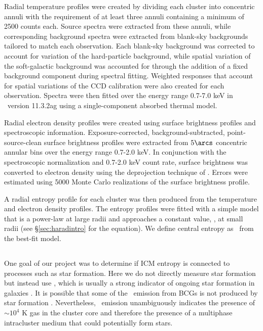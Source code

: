Radial temperature profiles were created by dividing each cluster into
concentric annuli with the requirement of at least three annuli
containing a minimum of 2500 counts each. Source spectra were
extracted from these annuli, while corresponding background spectra
were extracted from blank-sky backgrounds tailored to match each
observation. Each blank-sky background was corrected to account for
variation of the hard-particle background, while spatial variation of
the soft-galactic background was accounted for through the addition of
a fixed background component during spectral fitting. Weighted
responses that account for spatial variations of the CCD calibration
were also created for each observation. Spectra were then fitted over
the energy range 0.7-7.0 keV in \xspec\ version 11.3.2ag \citep{xspec}
using a single-component absorbed thermal model.

Radial electron density profiles were created using surface brightness
profiles and spectroscopic information. Exposure-corrected,
background-subtracted, point-source-clean surface brightness profiles
were extracted from $5\arcs$ concentric annular bins over the energy
range 0.7-2.0 keV. In conjunction with the spectroscopic normalization
and 0.7-2.0 keV count rate, surface brightness was converted to
electron density using the deprojection technique of
\cite{kriss83}. Errors were estimated using 5000 Monte Carlo
realizations of the surface brightness profile.

A radial entropy profile for each cluster was then produced from the
temperature and electron density profiles. The entropy profiles were
fitted with a simple model that is a power-law at large radii and
approaches a constant value, \kna, at small radii (see
\S\ref{sec:haradintro} for the equation). We define central entropy as
\kna\ from the best-fit model.

\subsection{\halpha}
\label{sec:haradha}

One goal of our project was to determine if ICM entropy is connected
to processes such as star formation. Here we do not directly measure
star formation but instead use \halpha, which is usually a strong
indicator of ongoing star formation in galaxies
\citep{kennicutt1,kennicutt2}. It is possible that some of the \halpha\
emission from BCGs is not produced by star formation
\citep{begelman90, sparks04, rusz08, ferland08}. Nevertheless,
\halpha\ emission unambiguously indicates the presence of $\sim 10^4$
K gas in the cluster core and therefore the presence of a multiphase
intracluster medium that could potentially form stars.

